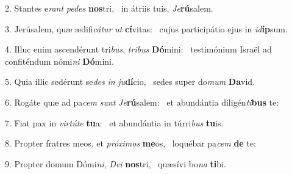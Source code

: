 2. Stantes e\textit{rant} \textit{pe}\textit{des} \textbf{nos}tri, \ast\  in átriis tuis, \textit{Je}\textbf{rú}salem.\

3. Jerúsalem, quæ ædifi\textit{cá}\textit{tur} \textit{ut} \textbf{cí}vitas: \ast\  cujus participátio ejus in \textit{id}\textbf{íp}sum.\

4. Illuc enim ascendérunt tri\textit{bus}, \textit{tri}\textit{bus} \textbf{Dó}mini: \ast\  testimónium Israël ad confiténdum nómi\textit{ni} \textbf{Dó}mini.\

5. Quia illic sedérunt se\textit{des} \textit{in} \textit{ju}\textbf{dí}cio, \ast\  sedes super do\textit{mum} \textbf{Da}vid.\

6. Rogáte quæ ad pa\textit{cem} \textit{sunt} \textit{Je}\textbf{rú}salem: \ast\  et abundántia diligén\textit{ti}\textbf{bus} te:\

7. Fiat pax in \textit{vir}\textit{tú}\textit{te} \textbf{tu}a: \ast\  et abundántia in túrri\textit{bus} \textbf{tu}is.\

8. Propter fratres meos, et \textit{pró}\textit{xi}\textit{mos} \textbf{me}os, \ast\  loquébar pa\textit{cem} \textbf{de} te:\

9. Propter domum Dómi\textit{ni}, \textit{De}\textit{i} \textbf{nos}tri, \ast\  quæsívi bo\textit{na} \textbf{ti}bi.\

